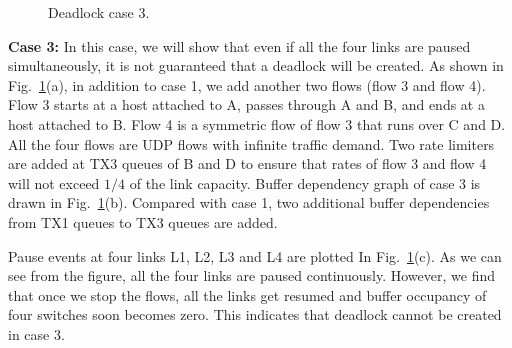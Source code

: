 \begin{figure}[t]

\caption{Deadlock case 3.}\label{fig:case3}

\end{figure}

\textbf{Case 3:} In this case, we will show that even if all the four links are paused simultaneously, it is not guaranteed that a deadlock will be created. As shown in Fig.~\ref{fig:case3}(a), in addition to case 1, we add another two flows (flow 3 and flow 4). Flow 3 starts at a host attached to A, passes through A and B, and ends at a host attached to B. Flow 4 is a symmetric flow of flow 3 that runs over C and D. All the four flows are UDP flows with infinite traffic demand. Two rate limiters are added at TX3 queues of B and D to ensure that rates of flow 3 and flow 4 will not exceed $1/4$ of the link capacity. Buffer dependency graph of case 3 is drawn in Fig.~\ref{fig:case3}(b). Compared with case 1, two additional buffer dependencies from TX1 queues to TX3 queues are added.

Pause events at four links L1, L2, L3 and L4 are plotted In Fig.~\ref{fig:case3}(c).  As we can see from the figure, all the four links are paused continuously. However, we find that once we stop the flows, all the links get resumed and buffer occupancy of four switches soon becomes zero. This indicates that deadlock cannot be created in case 3.

